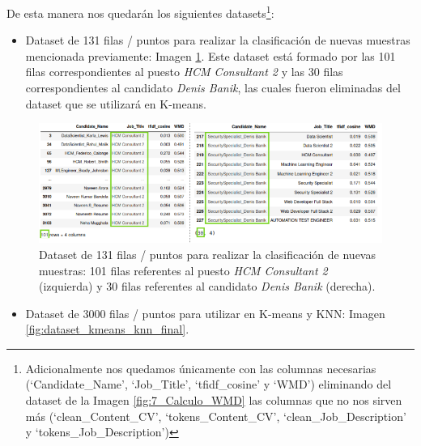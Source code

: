 \documentclass[12pt,a4paper]{article}
\begin{document}
\begin{sloppypar}
\cleardoublepage

De esta manera nos quedarán los siguientes datasets\footnote{Adicionalmente nos quedamos únicamente con las columnas necesarias (‘Candidate\_Name’, ‘Job\_Title’, ‘tfidf\_cosine’ y ‘WMD’) eliminando del dataset de la Imagen \ref{fig:7_Calculo_WMD} las columnas que no nos sirven más (‘clean\_Content\_CV’, ‘tokens\_Content\_CV’, ‘clean\_Job\_Description’ y ‘tokens\_Job\_Description’)}:

\begin{itemize}

\item Dataset de 131 filas / puntos para realizar la clasificación de nuevas muestras mencionada previamente: Imagen \ref{fig:eliminacion_hcm_2_y_denis}. Este dataset está formado por las 101 filas correspondientes al puesto \textit{HCM Consultant 2} y las 30 filas correspondientes al candidato \textit{Denis Banik}, las cuales fueron eliminadas del dataset que se utilizará en K-means.

\end{itemize}

\begin{figure}[H]   
\centering
\includegraphics[width=1\textwidth]{images/implementacion_5/eliminacion_hcm_2_y_denis.png}
\caption{Dataset de 131 filas / puntos para realizar la clasificación de nuevas muestras: 101 filas referentes al puesto \textit{HCM Consultant 2} (izquierda) y 30 filas referentes al candidato \textit{Denis Banik} (derecha).}
\label{fig:eliminacion_hcm_2_y_denis}
\end{figure}

\begin{itemize}

\item Dataset de 3000 filas / puntos para utilizar en K-means y KNN: Imagen \ref{fig:dataset_kmeans_knn_final}.


\end{itemize}
\end{sloppypar}
\end{document}
